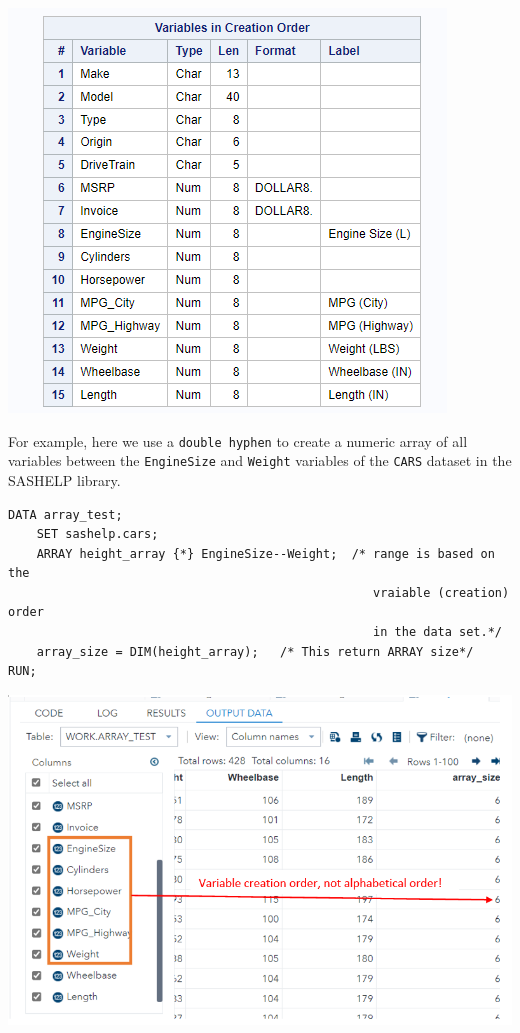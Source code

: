 \documentclass[
]{book}
\begin{document}
\begin{center}\includegraphics[width=1\linewidth]{img11/w11-carVarList-CreationOrder} \end{center}

For example, here we use a \texttt{double\ hyphen} to create a numeric array of all variables between the \texttt{EngineSize} and \texttt{Weight} variables of the \texttt{CARS} dataset in the SASHELP library.

\begin{verbatim}
DATA array_test;
    SET sashelp.cars;
    ARRAY height_array {*} EngineSize--Weight;  /* range is based on the 
                                                   vraiable (creation) order 
                                                   in the data set.*/
    array_size = DIM(height_array);   /* This return ARRAY size*/
RUN;
\end{verbatim}

\begin{center}\includegraphics[width=1\linewidth]{img11/w11-DoubleHyphens} \end{center}
\end{document}
